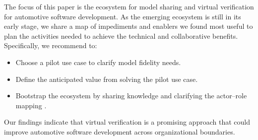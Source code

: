 The focus of this paper is 
the ecosystem for model sharing and virtual verification for automotive software development.
As the emerging ecosystem is still in its early stage,
we share a map of impediments and enablers we found most useful to plan the activities needed to achieve the technical and collaborative benefits.
Specifically, we recommend to:
\begin{itemize}
    \item Choose a pilot use case to clarify model fidelity needs.
    \item Define the anticipated value from solving the pilot use case.
    \item Bootstrap the ecosystem by sharing knowledge and clarifying the actor--role mapping \cite{kilamo2012proprietary}.
\end{itemize}

Our findings indicate that virtual verification is a promising approach that could improve automotive software development across organizational boundaries.






